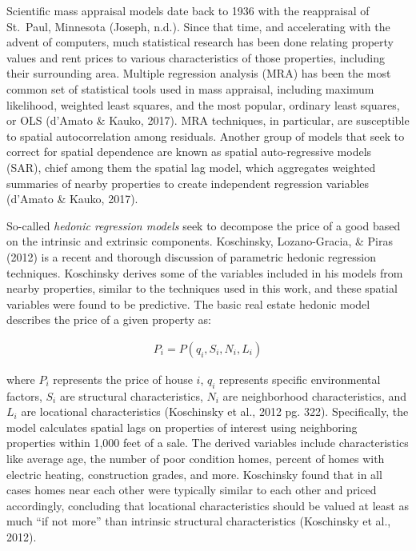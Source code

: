 \documentclass[12pt,]{article}
\begin{document}
Scientific mass appraisal models date back to 1936 with the reappraisal
of St.~Paul, Minnesota (Joseph, n.d.). Since that time, and accelerating
with the advent of computers, much statistical research has been done
relating property values and rent prices to various characteristics of
those properties, including their surrounding area. Multiple regression
analysis (MRA) has been the most common set of statistical tools used in
mass appraisal, including maximum likelihood, weighted least squares,
and the most popular, ordinary least squares, or OLS (d'Amato \& Kauko,
2017). MRA techniques, in particular, are susceptible to spatial
autocorrelation among residuals. Another group of models that seek to
correct for spatial dependence are known as spatial auto-regressive
models (SAR), chief among them the spatial lag model, which aggregates
weighted summaries of nearby properties to create independent regression
variables (d'Amato \& Kauko, 2017).

So-called \emph{hedonic regression models} seek to decompose the price
of a good based on the intrinsic and extrinsic components. Koschinsky,
Lozano-Gracia, \& Piras (2012) is a recent and thorough discussion of
parametric hedonic regression techniques. Koschinsky derives some of the
variables included in his models from nearby properties, similar to the
techniques used in this work, and these spatial variables were found to
be predictive. The basic real estate hedonic model describes the price
of a given property as:

\[
\begin{aligned}
 P_i = P(q_i,S_i, N_i, L_i)
\end{aligned}
\]

\noindent where \(P_i\) represents the price of house \(i\), \(q_i\)
represents specific environmental factors, \(S_i\) are structural
characteristics, \(N_i\) are neighborhood characteristics, and \(L_i\)
are locational characteristics (Koschinsky et al., 2012 pg. 322).
Specifically, the model calculates spatial lags on properties of
interest using neighboring properties within 1,000 feet of a sale. The
derived variables include characteristics like average age, the number
of poor condition homes, percent of homes with electric heating,
construction grades, and more. Koschinsky found that in all cases homes
near each other were typically similar to each other and priced
accordingly, concluding that locational characteristics should be valued
at least as much ``if not more'' than intrinsic structural
characteristics (Koschinsky et al., 2012).
\end{document}
